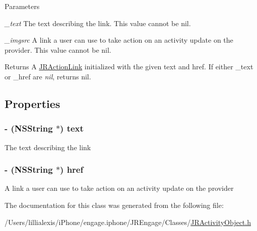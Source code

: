 \begin{DoxyParams}{Parameters}
\item[{\em \_\-text}]The text describing the link. This value cannot be {\ttfamily nil}.\item[{\em \_\-imgsrc}]A link a user can use to take action on an activity update on the provider. This value cannot be {\ttfamily nil}.\end{DoxyParams}
\begin{DoxyReturn}{Returns}
A \hyperlink{interface_j_r_action_link}{JRActionLink} initialized with the given text and href. If either {\ttfamily \_\-text} or {\ttfamily \_\-href} are {\itshape nil\/}, returns {\ttfamily nil}. 
\end{DoxyReturn}


\subsection{Properties}
\hypertarget{interface_j_r_action_link_a062c02005f1c35e651ffbcab51c50b21}{
\subsubsection[{text}]{\setlength{\rightskip}{0pt plus 5cm}-\/ (NSString $\ast$) text}}
\label{interface_j_r_action_link_a062c02005f1c35e651ffbcab51c50b21}
The text describing the link \hypertarget{interface_j_r_action_link_a45489781731e5965e20fa66af0bd3072}{
\subsubsection[{href}]{\setlength{\rightskip}{0pt plus 5cm}-\/ (NSString $\ast$) href}}
\label{interface_j_r_action_link_a45489781731e5965e20fa66af0bd3072}
A link a user can use to take action on an activity update on the provider 

The documentation for this class was generated from the following file:\begin{DoxyCompactItemize}
\item 
/Users/lillialexis/iPhone/engage.iphone/JREngage/Classes/\hyperlink{_j_r_activity_object_8h}{JRActivityObject.h}\end{DoxyCompactItemize}
